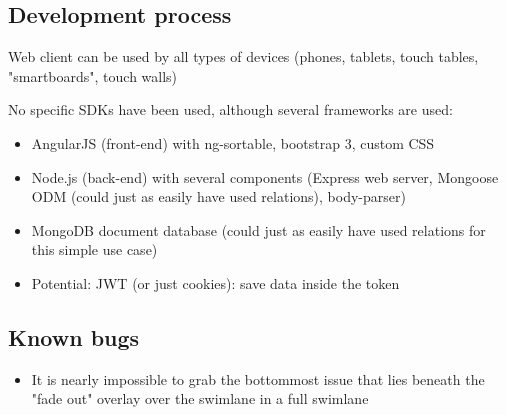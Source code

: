 \subsection{Development process}

Web client can be used by all types of devices (phones, tablets, touch tables, "smartboards", touch walls)

No specific SDKs have been used, although several frameworks are used:
\begin{itemize}
  \item AngularJS (front-end) with ng-sortable, bootstrap 3, custom CSS
  \item Node.js (back-end) with several components (Express web server, Mongoose ODM (could just as easily have used relations), body-parser)
  \item MongoDB document database (could just as easily have used relations for this simple use case)
  \item Potential: JWT (or just cookies): save data inside the token
\end{itemize}

\subsection{Known bugs}

\begin{itemize}
  \item It is nearly impossible to grab the bottommost issue that lies beneath the "fade out" overlay over the swimlane in a full swimlane
\end{itemize}
